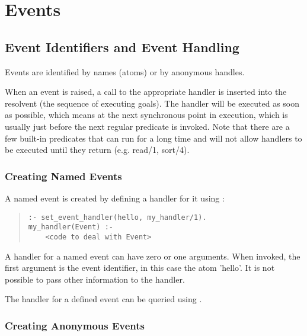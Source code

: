 \section{Events}

\subsection{Event Identifiers and Event Handling}

Events are identified by names (atoms) or by anonymous handles.

When an event is raised, a call to the appropriate handler is inserted
into the resolvent (the sequence of executing goals).
The handler will be executed as soon as possible, which means at the
next synchronous point in execution, which is usually just before the
next regular predicate is invoked. Note that there are a few
built-in predicates that can run for a long time and will not allow
handlers to be executed until they return (e.g. read/1, sort/4).


\subsubsection{Creating Named Events}

A named event is created by defining a handler for it using
:
\begin{quote}\begin{verbatim}
:- set_event_handler(hello, my_handler/1).
my_handler(Event) :-
    <code to deal with Event>
\end{verbatim}\end{quote}
A handler for a named event can have zero or one arguments. When invoked,
the first argument is the event identifier, in this case the atom 'hello'.
It is not possible to pass other information to the handler.

The handler for a defined event can be queried using
.


\subsubsection{Creating Anonymous Events}

